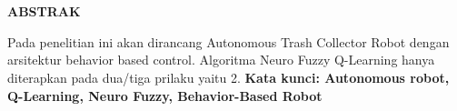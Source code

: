 \chapter*{}
\vspace*{-1.0cm}
\begin{center}
\normalfont\LARGE\textbf{ABSTRAK}
\end{center}

Pada penelitian ini akan dirancang Autonomous Trash Collector Robot dengan arsitektur behavior based control. Algoritma Neuro Fuzzy Q-Learning hanya diterapkan pada dua/tiga prilaku yaitu 
2.
\textbf{Kata kunci: Autonomous robot, Q-Learning, Neuro Fuzzy, Behavior-Based Robot} 











